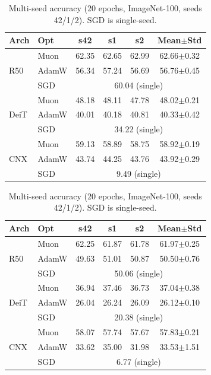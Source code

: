 \begin{table}[h]
\begin{minipage}{0.48\textwidth}
\centering
\caption{Multi-seed accuracy (20 epochs, Tiny-ImageNet, seeds 42/1/2). SGD is single-seed.}
\label{tab:multi_seed_tinyin}
\footnotesize
\begin{tabular}{@{}l@{\hskip 3pt}l@{\hskip 4pt}c@{\hskip 4pt}c@{\hskip 4pt}c@{\hskip 4pt}c@{}}
\toprule
Arch & Opt & s42 & s1 & s2 & Mean$\pm$Std \\
\midrule
\multirow{3}{*}{R50}
 & Muon  & 62.35 & 62.65 & 62.99 & 62.66$\pm$0.32 \\
 & AdamW & 56.34 & 57.24 & 56.69 & 56.76$\pm$0.45 \\
 & SGD   & \multicolumn{4}{c}{60.04 (single)} \\
\midrule
\multirow{3}{*}{DeiT}
 & Muon  & 48.18 & 48.11 & 47.78 & 48.02$\pm$0.21 \\
 & AdamW & 40.01 & 40.18 & 40.81 & 40.33$\pm$0.42 \\
 & SGD   & \multicolumn{4}{c}{34.22 (single)} \\
\midrule
\multirow{3}{*}{CNX}
 & Muon  & 59.13 & 58.89 & 58.75 & 58.92$\pm$0.19 \\
 & AdamW & 43.74 & 44.25 & 43.76 & 43.92$\pm$0.29 \\
 & SGD   & \multicolumn{4}{c}{9.49 (single)} \\
\bottomrule
\end{tabular}
\end{minipage}\hfill
\begin{minipage}{0.48\textwidth}
\centering
\caption{Multi-seed accuracy (20 epochs, ImageNet-100, seeds 42/1/2). SGD is single-seed.}
\label{tab:multi_seed_in100}
\footnotesize
\begin{tabular}{@{}l@{\hskip 3pt}l@{\hskip 4pt}c@{\hskip 4pt}c@{\hskip 4pt}c@{\hskip 4pt}c@{}}
\toprule
Arch & Opt & s42 & s1 & s2 & Mean$\pm$Std \\
\midrule
\multirow{3}{*}{R50}
 & Muon  & 62.25 & 61.87 & 61.78 & 61.97$\pm$0.25 \\
 & AdamW & 49.63 & 51.01 & 50.87 & 50.50$\pm$0.76 \\
 & SGD   & \multicolumn{4}{c}{50.06 (single)} \\
\midrule
\multirow{3}{*}{DeiT}
 & Muon  & 36.94 & 37.46 & 36.73 & 37.04$\pm$0.38 \\
 & AdamW & 26.04 & 26.24 & 26.09 & 26.12$\pm$0.10 \\
 & SGD   & \multicolumn{4}{c}{20.38 (single)} \\
\midrule
\multirow{3}{*}{CNX}
 & Muon  & 58.07 & 57.74 & 57.67 & 57.83$\pm$0.21 \\
 & AdamW & 33.62 & 35.00 & 31.98 & 33.53$\pm$1.51 \\
 & SGD   & \multicolumn{4}{c}{6.77 (single)} \\
\bottomrule
\end{tabular}
\end{minipage}
\end{table}

